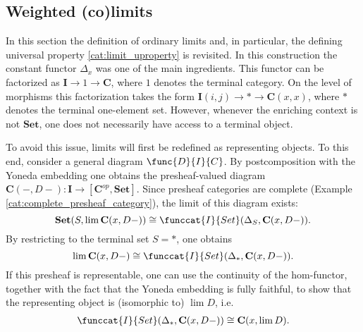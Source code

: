 
\subsection{Weighted (co)limits}

    In this section the definition of ordinary limits and, in particular, the defining universal property \ref{cat:limit_uproperty} is revisited. In this construction the constant functor $\Delta_x$ was one of the main ingredients. This functor can be factorized as $\mathbf{I}\rightarrow1\rightarrow\mathbf{C}$, where $1$ denotes the terminal category. On the level of morphisms this factorization takes the form $\mathbf{I}(i,j)\rightarrow\ast\rightarrow\mathbf{C}(x,x)$, where $\ast$ denotes the terminal one-element set. However, whenever the enriching context is not $\mathbf{Set}$, one does not necessarily have access to a terminal object.

    To avoid this issue, limits will first be redefined as representing objects. To this end, consider a general diagram $\func{D}{I}{C}$. By postcomposition with the Yoneda embedding one obtains the presheaf-valued diagram $\mathbf{C}(-,D-):\mathbf{I}\rightarrow[\mathbf{C}^{op}, \mathbf{Set}]$. Since presheaf categories are complete (Example \ref{cat:complete_presheaf_category}), the limit of this diagram exists: \[\mathbf{Set}(S,\lim\mathbf{C}(x,D-))\cong\funccat{I}{Set}(\Delta_S, \mathbf{C}(x,D-)).\] By restricting to the terminal set $S=\ast$, one obtains \[\lim\mathbf{C}(x,D-)\cong\funccat{I}{Set}(\Delta_\ast, \mathbf{C}(x,D-)).\] If this presheaf is representable, one can use the continuity of the hom-functor, together with the fact that the Yoneda embedding is fully faithful, to show that the representing object is (isomorphic to) $\lim D$, i.e.
    \begin{gather}
        \funccat{I}{Set}(\Delta_\ast,\mathbf{C}(x,D-))\cong\mathbf{C}(x,\lim D).
    \end{gather}


